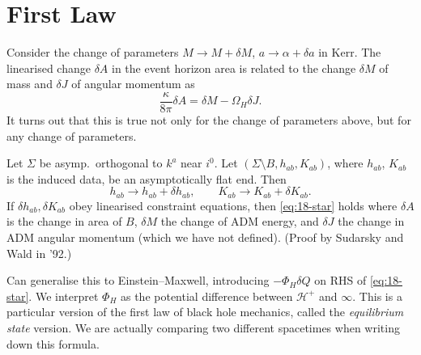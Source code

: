 \section{First Law}%
\label{sec:first_law}

Consider the change of parameters $M \to M + \delta M$, $a \to \alpha + \delta a$ in Kerr.
The linearised change $\delta A$ in the event horizon area is related to the change $\delta M$ of mass and $\delta J$ of angular momentum as
\begin{equation}
  \label{eq:18-star}
  \frac{\kappa}{8 \pi} \delta A = \delta M - \Omega_H \delta J.
\end{equation}
It turns out that this is true not only for the change of parameters above, but for any change of parameters.

\begin{figure}[ht]
    \centering
    \caption{}
    \label{fig:l18f2}
\end{figure}

Let $\Sigma$ be asymp.~orthogonal to $k^{a}$ near $i^0$.
Let $(\Sigma \setminus B, h_{ab}, K_{ab})$, where $h_{ab}$, $K_{ab}$ is the induced data, be an asymptotically flat end.
Then
\begin{equation}
  h_{ab} \to h_{ab} + \delta h_{ab}, \qquad
  K_{ab} \to K_{ab} + \delta K_{ab}.
\end{equation}
If $\delta h_{ab}, \delta K_{ab}$ obey linearised constraint equations, then \eqref{eq:18-star} holds where $\delta A$ is the change in area of $B$, $\delta M$ the change of ADM energy, and $\delta J$ the change in ADM angular momentum (which we have not defined).
(Proof by Sudarsky and Wald in '92.)

Can generalise this to Einstein--Maxwell, introducing $- \Phi_H \delta Q$ on RHS of \eqref{eq:18-star}.
We interpret $\Phi_H$ as the potential difference between $\mathcal{H}^+$ and $\infty$.
This is a particular version of the first law of black hole mechanics, called the \emph{equilibrium state} version.
We are actually comparing two different spacetimes when writing down this formula.

